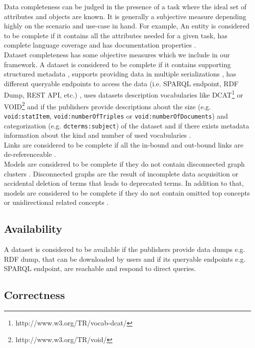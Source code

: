 \documentclass[onecolumn, crcready]{iosart2c}
\begin{document}
Data completeness can be judged in the presence of a task where the ideal set of attributes and objects are known. It is generally a subjective measure depending highly on the scenario and use-case in hand. For example, An entity is considered to be complete if it contains all the attributes needed for a given task, has complete language coverage \cite{Mader2012} and has documentation properties \cite{w3c_skos_rec}\cite{Mader2012}.\\
Dataset completeness has some objective measures which we include in our framework. A dataset is considered to be complete if it contains supporting structured metadata \cite{Hogan2010}, supports providing data in multiple serializations \cite{Framework2012}, has different queryable endpoints to access the data (i.e. SPARQL endpoint, RDF Dump, REST API, etc.) \cite{Framework2012}, uses datasets description vocabularies like DCAT\footnote{http://www.w3.org/TR/vocab-dcat/} or VOID\footnote{http://www.w3.org/TR/void/} and if the publishers provide descriptions about the size (e.g. \texttt{void:statItem}, \texttt{void:numberOfTriples} or \texttt{void:numberOfDocuments}) and categorization (e.g. \texttt{dcterms:subject}) of the dataset and if there exists metadata information about the kind and number of used vocabularies \cite{Framework2012}.\\
Links are considered to be complete if all the in-bound and out-bound links are de-referenceable \cite{Hogan2010}\cite{Mader2012}\cite{Gueret2012}.\\
Models are considered to be complete if they do not contain disconnected graph clusters \cite{Mader2012}. Disconnected graphs are the result of incomplete data acquisition or accidental deletion of terms that leads to deprecated terms. In addition to that, models are considered to be complete if they do not contain omitted top concepts or unidirectional related concepts \cite{Hogan2010}.

\subsection{Availability}

A dataset is considered to be available if the publishers provide data dumps e.g. RDF dump, that can be downloaded by users \cite{flemming2010}\cite{Hogan2010} and if its queryable endpoints e.g. SPARQL endpoint, are reachable and respond to direct queries.

\subsection{Correctness}
\end{document}
